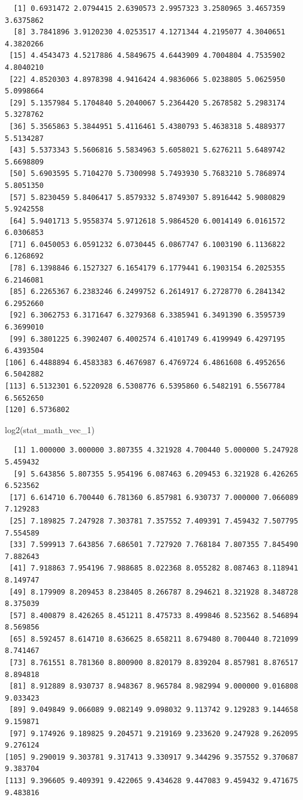 \documentclass[
  letterpaper,
  DIV=11,
  numbers=noendperiod]{scrreprt}
\newenvironment{Shaded}{\begin{snugshade}}{\end{snugshade}}
\newcommand{\FunctionTok}[1]{\textcolor[rgb]{0.28,0.35,0.67}{#1}}
\newcommand{\NormalTok}[1]{\textcolor[rgb]{0.00,0.23,0.31}{#1}}
\begin{document}
\begin{verbatim}
  [1] 0.6931472 2.0794415 2.6390573 2.9957323 3.2580965 3.4657359 3.6375862
  [8] 3.7841896 3.9120230 4.0253517 4.1271344 4.2195077 4.3040651 4.3820266
 [15] 4.4543473 4.5217886 4.5849675 4.6443909 4.7004804 4.7535902 4.8040210
 [22] 4.8520303 4.8978398 4.9416424 4.9836066 5.0238805 5.0625950 5.0998664
 [29] 5.1357984 5.1704840 5.2040067 5.2364420 5.2678582 5.2983174 5.3278762
 [36] 5.3565863 5.3844951 5.4116461 5.4380793 5.4638318 5.4889377 5.5134287
 [43] 5.5373343 5.5606816 5.5834963 5.6058021 5.6276211 5.6489742 5.6698809
 [50] 5.6903595 5.7104270 5.7300998 5.7493930 5.7683210 5.7868974 5.8051350
 [57] 5.8230459 5.8406417 5.8579332 5.8749307 5.8916442 5.9080829 5.9242558
 [64] 5.9401713 5.9558374 5.9712618 5.9864520 6.0014149 6.0161572 6.0306853
 [71] 6.0450053 6.0591232 6.0730445 6.0867747 6.1003190 6.1136822 6.1268692
 [78] 6.1398846 6.1527327 6.1654179 6.1779441 6.1903154 6.2025355 6.2146081
 [85] 6.2265367 6.2383246 6.2499752 6.2614917 6.2728770 6.2841342 6.2952660
 [92] 6.3062753 6.3171647 6.3279368 6.3385941 6.3491390 6.3595739 6.3699010
 [99] 6.3801225 6.3902407 6.4002574 6.4101749 6.4199949 6.4297195 6.4393504
[106] 6.4488894 6.4583383 6.4676987 6.4769724 6.4861608 6.4952656 6.5042882
[113] 6.5132301 6.5220928 6.5308776 6.5395860 6.5482191 6.5567784 6.5652650
[120] 6.5736802
\end{verbatim}

\begin{Shaded}
\begin{Highlighting}[]
\FunctionTok{log2}\NormalTok{(stat\_math\_vec\_1)}
\end{Highlighting}
\end{Shaded}

\begin{verbatim}
  [1] 1.000000 3.000000 3.807355 4.321928 4.700440 5.000000 5.247928 5.459432
  [9] 5.643856 5.807355 5.954196 6.087463 6.209453 6.321928 6.426265 6.523562
 [17] 6.614710 6.700440 6.781360 6.857981 6.930737 7.000000 7.066089 7.129283
 [25] 7.189825 7.247928 7.303781 7.357552 7.409391 7.459432 7.507795 7.554589
 [33] 7.599913 7.643856 7.686501 7.727920 7.768184 7.807355 7.845490 7.882643
 [41] 7.918863 7.954196 7.988685 8.022368 8.055282 8.087463 8.118941 8.149747
 [49] 8.179909 8.209453 8.238405 8.266787 8.294621 8.321928 8.348728 8.375039
 [57] 8.400879 8.426265 8.451211 8.475733 8.499846 8.523562 8.546894 8.569856
 [65] 8.592457 8.614710 8.636625 8.658211 8.679480 8.700440 8.721099 8.741467
 [73] 8.761551 8.781360 8.800900 8.820179 8.839204 8.857981 8.876517 8.894818
 [81] 8.912889 8.930737 8.948367 8.965784 8.982994 9.000000 9.016808 9.033423
 [89] 9.049849 9.066089 9.082149 9.098032 9.113742 9.129283 9.144658 9.159871
 [97] 9.174926 9.189825 9.204571 9.219169 9.233620 9.247928 9.262095 9.276124
[105] 9.290019 9.303781 9.317413 9.330917 9.344296 9.357552 9.370687 9.383704
[113] 9.396605 9.409391 9.422065 9.434628 9.447083 9.459432 9.471675 9.483816
\end{verbatim}
\end{document}
